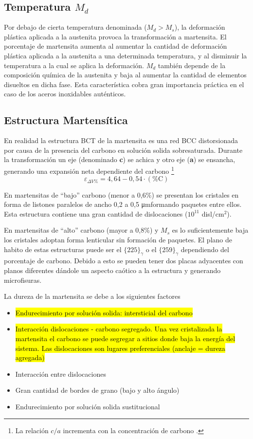 \documentclass{article}
\newcommand{\um}{\si{\micro \meter}}
\begin{document}
\subsection[Temperatura {\it Md}]{Temperatura $M_d$}
Por debajo de cierta temperatura denominada ($M_d> M_s$), la
deformación plástica aplicada a la austenita provoca la transformación a martensita. El porcentaje de martensita aumenta al aumentar la cantidad de deformación plástica aplicada a la austenita a una determinada temperatura, y al disminuir la temperatura a la cual se aplica la deformación. $M_d$ también depende de la composición química de la austenita y baja al aumentar la cantidad de elementos disueltos en dicha fase. Esta característica cobra gran importancia práctica en el caso de los aceros inoxidables auténticos. 

\subsection{Estructura Martensítica}
En realidad la estructura BCT de la martensita es una red BCC distorsionada por causa de la presencia del carbono en solución solida sobresaturada. Durante la transformación un eje (denominado \textbf{c}) se achica y otro eje (\textbf{a}) se ensancha, generando una expansión neta dependiente del carbono \footnote{La relación $c/a$ incrementa con la concentración de carbono \cite{gottstein2013physical}.}
\[
\varepsilon_{\Delta V \%} = 4,64-0,54\cdot (\% \mathrm{C})
\]



En martensitas de ``bajo'' carbono (menor a 0,6\%) se presentan los cristales en forma de listones paralelos de ancho 0,2 a 0,5 \um formando paquetes entre ellos. Esta estructura contiene una gran cantidad de dislocaciones ($10^11$ disl/cm$^2$).

En martensitas de ``alto'' carbono (mayor a 0,8\%) y $M_s$ es lo suficientemente baja los cristales adoptan forma lenticular sin formación de paquetes. El plano de habito de estas estructuras puede ser el $\{225 \}_\gamma$ o el $\{259 \}_\gamma$ dependiendo del porcentaje de carbono. Debido a esto se pueden tener dos placas adyacentes con planos diferentes dándole un aspecto caótico a la estructura y generando microfisuras.

La dureza de la martensita se debe a los siguientes factores
\begin{itemize}
    \item \hl{Endurecimiento por solución solida: intersticial del carbono}
    \item \hl{Interacción dislocaciones - carbono segregado. Una vez cristalizada la martensita el carbono se puede segregar a sitios donde baja la energía del sistema. Las dislocaciones son lugares preferenciales (anclaje = dureza agregada)}
    \item Interacción entre dislocaciones
    \item Gran cantidad de bordes de grano (bajo y alto ángulo)
    \item Endurecimiento por solución solida sustitucional
\end{itemize}
\end{document}
